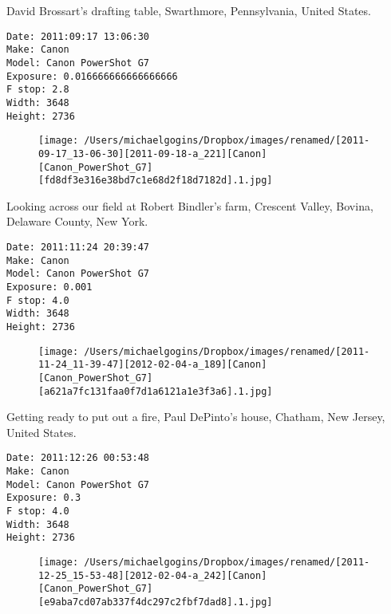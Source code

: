 \documentclass[11pt,letter,DIV=14,paper=landscape]{scrbook}
\begin{document}
\clearpage
\noindent David Brossart's drafting table, Swarthmore, Pennsylvania, United States.
\noindent
\begin{lstlisting}
Date: 2011:09:17 13:06:30
Make: Canon
Model: Canon PowerShot G7
Exposure: 0.016666666666666666
F stop: 2.8
Width: 3648
Height: 2736
\end{lstlisting}
\clearpage

\begin{figure}
\texttt{[image: /Users/michaelgogins/Dropbox/images/renamed/[2011-09-17\_13-06-30][2011-09-18-a\_221][Canon][Canon\_PowerShot\_G7][fd8df3e316e38bd7c1e68d2f18d7182d].1.jpg]}
\end{figure}
    
\clearpage
\noindent Looking across our field at Robert Bindler's farm, Crescent Valley, Bovina, Delaware County, New York.
\noindent
\begin{lstlisting}
Date: 2011:11:24 20:39:47
Make: Canon
Model: Canon PowerShot G7
Exposure: 0.001
F stop: 4.0
Width: 3648
Height: 2736
\end{lstlisting}
\clearpage

\begin{figure}
\texttt{[image: /Users/michaelgogins/Dropbox/images/renamed/[2011-11-24\_11-39-47][2012-02-04-a\_189][Canon][Canon\_PowerShot\_G7][a621a7fc131faa0f7d1a6121a1e3f3a6].1.jpg]}
\end{figure}
    
\clearpage
\noindent Getting ready to put out a fire, Paul DePinto's house, Chatham, New Jersey, United States.
\noindent
\begin{lstlisting}
Date: 2011:12:26 00:53:48
Make: Canon
Model: Canon PowerShot G7
Exposure: 0.3
F stop: 4.0
Width: 3648
Height: 2736
\end{lstlisting}
\clearpage

\begin{figure}
\texttt{[image: /Users/michaelgogins/Dropbox/images/renamed/[2011-12-25\_15-53-48][2012-02-04-a\_242][Canon][Canon\_PowerShot\_G7][e9aba7cd07ab337f4dc297c2fbf7dad8].1.jpg]}
\end{figure}
    
\end{document}
